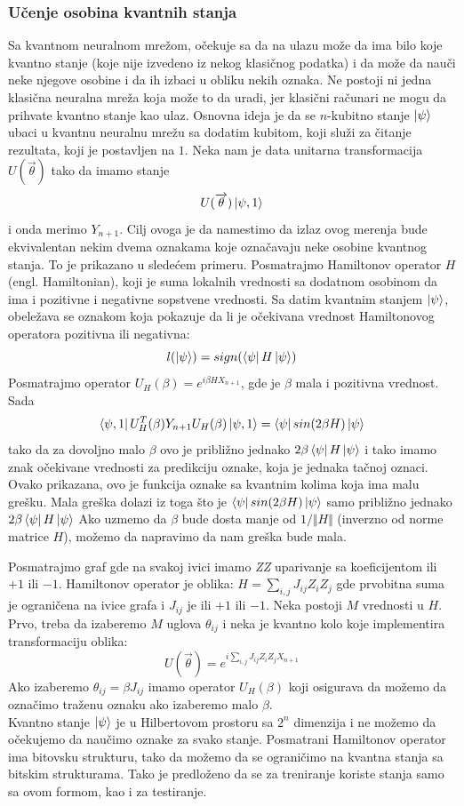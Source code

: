 \documentclass[12pt, letterpaper, oneside]{article}
\begin{document}
\subsubsection{Učenje osobina kvantnih stanja}
Sa kvantnom neuralnom mrežom, očekuje sa da na ulazu može da ima bilo koje kvantno stanje (koje nije izvedeno iz nekog klasičnog podatka)
i da može da nauči neke njegove osobine i da ih izbaci u obliku nekih oznaka. Ne postoji ni jedna klasična neuralna mreža koja može to da uradi, jer klasični računari ne mogu da prihvate kvantno stanje kao ulaz.
Osnovna ideja je da se $n$-kubitno stanje $\Ket{\psi}$ ubaci u kvantnu neuralnu mrežu sa dodatim kubitom, koji služi za čitanje rezultata, koji je postavljen na $1$.
Neka nam je data unitarna transformacija $U(\overrightarrow{\theta})$ tako da imamo stanje
\[
    U(\overrightarrow{\theta})\Ket{\psi,1}
\] 
i onda merimo $Y_{n+1}$. Cilj ovoga je da namestimo da izlaz ovog merenja bude ekvivalentan nekim dvema oznakama koje označavaju neke osobine kvantnog stanja.
To je prikazano u sledećem primeru.
Posmatrajmo Hamiltonov operator $H$ (engl. Hamiltonian), koji je suma lokalnih vrednosti sa dodatnom osobinom da ima i pozitivne i negativne sopstvene vrednosti.
Sa datim kvantnim stanjem $\ket{\psi}$, obeležava se oznakom koja pokazuje da li je očekivana vrednost Hamiltonovog operatora pozitivna ili negativna:
\[
    l(\Ket{\psi}) = sign(\bra{\psi}H\Ket{\psi})
\]
Posmatrajmo operator $U_H(\beta) = e^{i\beta HX_{n+1}}$, gde je $\beta$ mala i pozitivna vrednost. Sada
\[
    \Bra{\psi,1}U_H^T(\beta)Y_{n+1}U_H(\beta)\Ket{\psi,1} = \bra{\psi}sin(2\beta H)\Ket{\psi}
\]
tako da za dovoljno malo $\beta$ ovo je približno jednako $2\beta\bra{\psi}H\Ket{\psi}$ i tako imamo znak očekivane vrednosti za 
predikciju oznake, koja je jednaka tačnoj oznaci. Ovako prikazana, ovo je funkcija oznake sa kvantnim kolima koja ima malu grešku.
Mala greška dolazi iz toga što je $\bra{\psi}sin(2\beta H)\Ket{\psi}$ samo približno jednako $2\beta\bra{\psi}H\Ket{\psi}$
Ako uzmemo da $\beta$ bude dosta manje od $1/\Vert H \Vert$ (inverzno od norme matrice $H$), možemo da napravimo da nam greška bude mala.

Posmatrajmo graf gde na svakoj ivici imamo \textit{ZZ} uparivanje sa koeficijentom ili $+1$ ili $-1$.
Hamiltonov operator je oblika: $H = \sum_{i,j}J_{ij}Z_iZ_j$ gde prvobitna suma je ograničena na ivice grafa i $J_{ij}$ je ili $+1$ ili $-1$.
Neka postoji $M$ vrednosti u $H$. Prvo, treba da izaberemo $M$ uglova $\theta_{ij}$ i neka je kvantno kolo koje implementira transformaciju oblika:
\[
    U(\overrightarrow{\theta}) = e^{i\sum_{i,j}J_{ij}Z_iZ_jX_{n+1}}
\]
Ako izaberemo $\theta_{ij}=\beta J_{ij}$ imamo operator $U_H(\beta)$ koji osigurava da možemo da označimo traženu oznaku ako izaberemo malo $\beta$.\\
Kvantno stanje $\Ket{\psi}$ je u Hilbertovom prostoru sa $2^n$ dimenzija i ne možemo da očekujemo da naučimo oznake za svako stanje.
Posmatrani Hamiltonov operator ima bitovsku strukturu, tako da možemo da se ograničimo na kvantna stanja sa bitskim strukturama.
Tako je predloženo da se za treniranje koriste stanja samo sa ovom formom, kao i za testiranje.
\newpage
\end{document}
